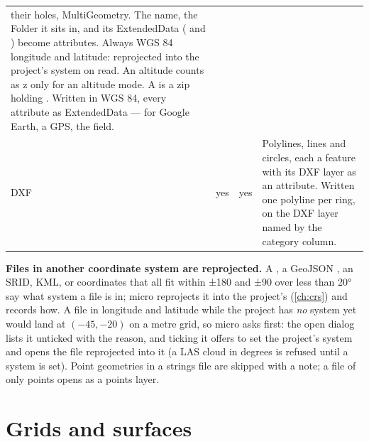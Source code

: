 \begin{tabularx}{\linewidth}{@{}p{27mm}p{9mm}p{9mm}L@{}}
  their holes, MultiGeometry. The name, the Folder it sits in, and its ExtendedData
  ( and ) become attributes. Always WGS 84 longitude and latitude:
  reprojected into the project's system on read. An altitude counts as z only for an
   altitude mode. A  is a zip holding . Written in WGS 84,
  every attribute as ExtendedData — for Google Earth, a GPS, the field. \\
DXF  & yes & yes & Polylines, lines and circles, each a feature with its DXF layer as an
  attribute. Written one polyline per ring, on the DXF layer named by the category column. \\
\bottomrule
\end{tabularx}

\begin{note}
\textbf{Files in another coordinate system are reprojected.} A , a GeoJSON
, an SRID, KML, or coordinates that all fit within ±180 and ±90 over less than 20° say
what system a file is in; micro reprojects it into the project's (\cref{ch:crs}) and records how. A
file in longitude and latitude while the project has \emph{no} system yet would land at $(-45, -20)$ on
a metre grid, so micro asks first: the open dialog lists it unticked with the reason, and ticking it
offers to set the project's system and opens the file reprojected into it (a LAS cloud in degrees is
refused until a system is set). Point geometries in a strings file are
skipped with a note; a file of only points opens as a points layer.
\end{note}

\section{Grids and surfaces}\label{sec:formats-grids}

